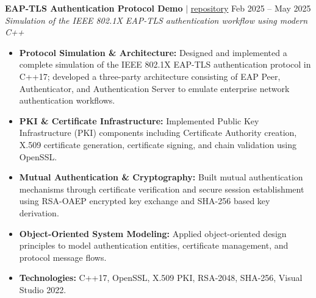 \documentclass[10pt,a4paper]{article}
\begin{document}
\noindent \textbf{EAP-TLS Authentication Protocol Demo} $|$ \href{https://github.com/vyquochuy/EAP-TLS-DEMO}{repository} \hfill Feb 2025 -- May 2025\\
\textit{Simulation of the IEEE 802.1X EAP-TLS authentication workflow using modern C++}\\
\begin{itemize}[leftmargin=0.25in, nosep]
    \item \textbf{Protocol Simulation \& Architecture:} Designed and implemented a complete simulation of the IEEE 802.1X EAP-TLS authentication protocol in C++17; developed a three-party architecture consisting of EAP Peer, Authenticator, and Authentication Server to emulate enterprise network authentication workflows.

    \item \textbf{PKI \& Certificate Infrastructure:} Implemented Public Key Infrastructure (PKI) components including Certificate Authority creation, X.509 certificate generation, certificate signing, and chain validation using OpenSSL.

    \item \textbf{Mutual Authentication \& Cryptography:} Built mutual authentication mechanisms through certificate verification and secure session establishment using RSA-OAEP encrypted key exchange and SHA-256 based key derivation.

    \item \textbf{Object-Oriented System Modeling:} Applied object-oriented design principles to model authentication entities, certificate management, and protocol message flows.

    \item \textbf{Technologies:} C++17, OpenSSL, X.509 PKI, RSA-2048, SHA-256, Visual Studio 2022.
\end{itemize}
\vspace{10pt}
\end{document}

